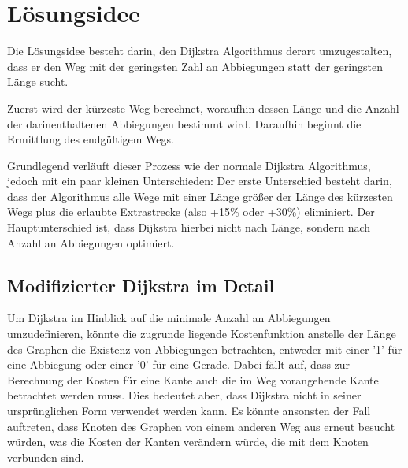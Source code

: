 \documentclass{article}
\theoremstyle{nonumberplain}
\begin{document}
    
\section{Lösungsidee}

Die Lösungsidee besteht darin, den Dijkstra Algorithmus derart umzugestalten, dass er den Weg mit der geringsten Zahl an Abbiegungen statt der geringsten Länge sucht.

Zuerst wird der kürzeste Weg berechnet, woraufhin dessen Länge und die Anzahl der darinenthaltenen Abbiegungen bestimmt wird. Daraufhin beginnt die Ermittlung des endgültigem Wegs.

Grundlegend verläuft dieser Prozess wie der normale Dijkstra Algorithmus, jedoch mit ein paar kleinen Unterschieden:
Der erste Unterschied besteht darin, dass der Algorithmus alle Wege mit einer Länge größer der Länge des kürzesten Wegs plus die erlaubte Extrastrecke (also +15\% oder +30\%) eliminiert.
Der Hauptunterschied ist, dass Dijkstra hierbei nicht nach Länge, sondern nach Anzahl an Abbiegungen optimiert.

\subsection{Modifizierter Dijkstra im Detail}

Um Dijkstra im Hinblick auf die minimale Anzahl an Abbiegungen umzudefinieren, könnte die zugrunde liegende Kostenfunktion anstelle der Länge des Graphen die Existenz von Abbiegungen betrachten, entweder mit einer '1' für eine Abbiegung oder einer '0' für eine Gerade. 
Dabei fällt auf, dass zur Berechnung der Kosten für eine Kante auch die im Weg vorangehende Kante betrachtet werden muss.
Dies bedeutet aber, dass Dijkstra nicht in seiner ursprünglichen Form verwendet werden kann. Es könnte ansonsten der Fall auftreten, dass Knoten des Graphen von einem anderen Weg aus erneut besucht würden, was die Kosten der Kanten verändern würde, die mit dem Knoten verbunden sind.

\begin {center}
\end{center}
\end{document}
